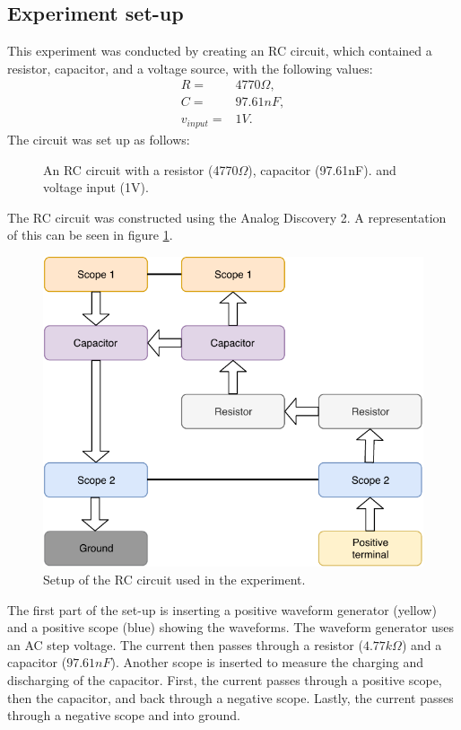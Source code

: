 \subsection{Experiment set-up}
This experiment was conducted by creating an RC circuit, which contained a resistor, capacitor, and a voltage source, with the following values:
\begin{align*}
 R =& 4770\Omega, \\
 C =& 97.61nF,
 \\
 v_{input} =& 1 V.
\end{align*}
The circuit was set up as follows:
\begin{figure}[H]
	
	\caption{An RC circuit with a resistor (4770$\Omega$), capacitor (97.61nF). and voltage input (1V).}
\end{figure}
\noindent
The RC circuit was constructed using the Analog Discovery 2. A representation of this can be seen in figure \ref{rc_flow}.
\begin{figure}[H]
	\center
		\includegraphics{fig/img/charging.pdf}
	\caption{Setup of the RC circuit used in the experiment.}
	\label{rc_flow}
\end{figure}
\noindent
The first part of the set-up is inserting a positive waveform generator (yellow) and a positive scope (blue) showing the waveforms. The waveform generator uses an AC step voltage. The current then passes through a resistor ($4.77 k\Omega$) and a capacitor ($97.61 nF$). Another scope is inserted to measure the charging and discharging of the capacitor. First, the current passes through a positive scope, then the capacitor, and back through a negative scope. Lastly, the current passes through a negative scope and into ground.
